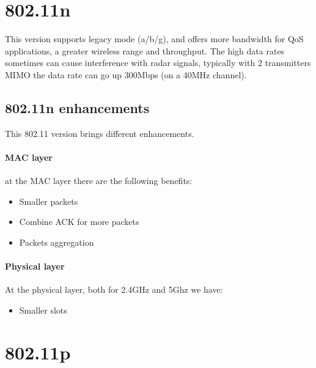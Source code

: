\section{802.11n}

This version supports legacy mode (a/b/g), and offers more bandwidth for QoS
applications, a greater wireless range and throughput.
The high data rates sometimes can cause interference with radar signals,
typically with 2 transmitters MIMO the data rate can go up 300Mbps (on a 40MHz
channel).

\subsection{802.11n enhancements}

This 802.11 version brings different enhancements.

\paragraph*{MAC layer} at the MAC layer there are the following benefits:
\begin{itemize}
\item Smaller packets
\item Combine ACK for more packets
\item Packets aggregation
\end{itemize}

\paragraph*{Physical layer} At the physical layer, both for 2.4GHz and 5Ghz we
have:
\begin{itemize}
\item Smaller slots
\end{itemize}

\section{802.11p}
